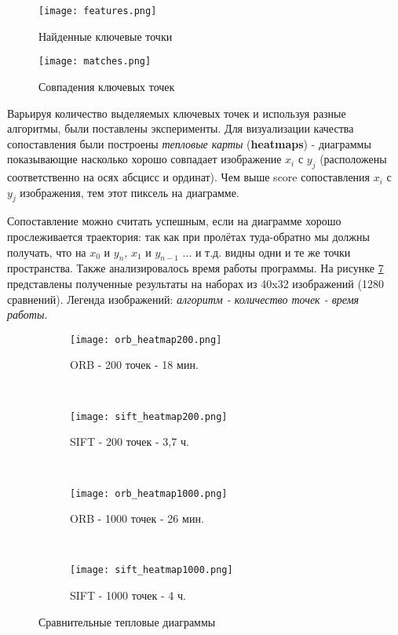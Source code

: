 \begin{figure}[h]
    \centering
    \texttt{[image: features.png]}
    \caption{Найденные ключевые точки}
    \label{fig:features}
\end{figure}

\begin{figure}[h]
    \centering
    \texttt{[image: matches.png]}
    \caption{Совпадения ключевых точек}
    \label{fig:matches}
\end{figure}

Варьируя количество выделяемых ключевых точек и используя разные алгоритмы, были поставлены эксперименты. Для визуализации качества сопоставления были построены \textit{тепловые карты} (\textbf{heatmaps}) - диаграммы показывающие насколько хорошо совпадает изображение $x_i$ с $y_j$ (расположены соответственно на осях абсцисс и ординат). Чем выше score сопоставления $x_i$ с $y_j$ изображения, тем  этот пиксель на диаграмме.

Сопоставление можно считать успешным, если на диаграмме хорошо прослеживается траектория: так как при пролётах туда-обратно мы должны получать, что на $x_0$ и $y_n$, $x_1$ и $y_{n-1}$ ... и т.д. видны одни и те же точки пространства. Также анализировалось время работы программы. На рисунке \ref{fig:heatmaps} представлены полученные результаты на наборах из 40x32 изображений (1280 сравнений). Легенда изображений: \textit{алгоритм - количество точек - время работы}.

\begin{figure}[h]
    \centering
    \begin{subfigure}[h]{0.45\textwidth}
        \texttt{[image: orb\_heatmap200.png]}
        \caption{ORB - 200 точек - 18 мин.}
        \label{fig:orb_200}
    \end{subfigure}
    ~
    \begin{subfigure}[h]{0.45\textwidth}
        \texttt{[image: sift\_heatmap200.png]}
        \caption{SIFT - 200 точек - 3,7 ч.}
        \label{fig:sift_200}
    \end{subfigure}
    ~
    \begin{subfigure}[h]{0.45\textwidth}
        \texttt{[image: orb\_heatmap1000.png]}
        \caption{ORB - 1000 точек - 26 мин.}
        \label{fig:mouse}
    \end{subfigure}
    ~
    \begin{subfigure}[h]{0.45\textwidth}
        \texttt{[image: sift\_heatmap1000.png]}
        \caption{SIFT - 1000 точек - 4 ч.}
        \label{fig:mouse}
    \end{subfigure}
    \caption{Сравнительные тепловые диаграммы}
    \label{fig:heatmaps}
\end{figure}

